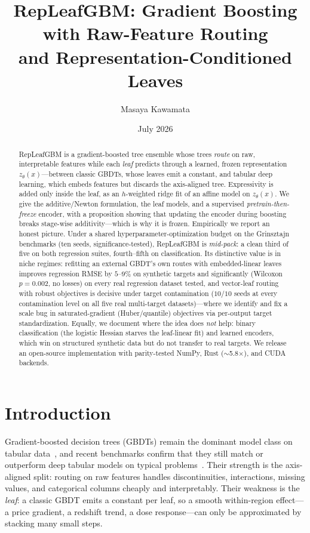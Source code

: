 \documentclass[11pt]{article}
\title{RepLeafGBM: Gradient Boosting with Raw-Feature Routing\\
and Representation-Conditioned Leaves}
\author{Masaya Kawamata}
\date{July 2026}
\newcommand{\zt}{z_{\theta}}
\begin{document}
\maketitle

\begin{abstract}
RepLeafGBM is a gradient-boosted tree ensemble whose trees \emph{route} on raw,
interpretable features while each \emph{leaf} predicts through a learned, frozen
representation $\zt(x)$---between classic GBDTs, whose leaves emit a constant,
and tabular deep learning, which embeds features but discards the axis-aligned
tree. Expressivity is added only inside the leaf, as an $h$-weighted ridge fit
of an affine model on $\zt(x)$. We give the additive/Newton formulation, the
leaf models, and a supervised \emph{pretrain-then-freeze} encoder, with a
proposition showing that updating the encoder during boosting breaks stage-wise
additivity---which is why it is frozen. Empirically we report an honest
picture. Under a shared hyperparameter-optimization budget on the Grinsztajn
benchmarks (ten seeds, significance-tested), RepLeafGBM is \emph{mid-pack}: a
clean third of five on both regression suites, fourth--fifth on classification.
Its distinctive value is in niche regimes: refitting an external GBDT's own
routes with embedded-linear leaves improves regression RMSE by $5$--$9\%$ on
synthetic targets and significantly (Wilcoxon $p=0.002$, no losses) on every
real regression dataset tested, and vector-leaf routing with robust objectives
is decisive under target contamination ($10/10$ seeds at every contamination
level on all five real multi-target datasets)---where we identify and fix a
scale bug in saturated-gradient (Huber/quantile) objectives via per-output
target standardization. Equally, we document where the idea does \emph{not}
help: binary classification (the logistic Hessian starves the leaf-linear fit)
and learned encoders, which win on structured synthetic data but do not
transfer to real targets. We release an open-source implementation with
parity-tested NumPy, Rust ($\sim$5.8$\times$), and CUDA backends.
\end{abstract}

\section{Introduction}
\label{sec:intro}

Gradient-boosted decision trees (GBDTs) remain the dominant model class on tabular
data~\citep{friedman2001greedy,chen2016xgboost,ke2017lightgbm,prokhorenkova2018catboost},
and recent benchmarks confirm that they still match or outperform deep tabular models
on typical problems~\citep{grinsztajn2022why}. Their strength is the axis-aligned
split: routing on raw features handles discontinuities, interactions, missing values,
and categorical columns cheaply and interpretably. Their weakness is the
\emph{leaf}: a classic GBDT emits a constant per leaf, so a smooth within-region
effect---a price gradient, a redshift trend, a dose response---can only be
approximated by stacking many small steps.
\end{document}
